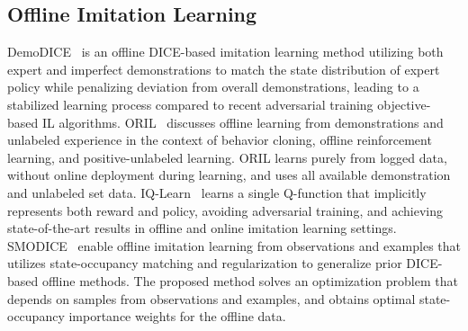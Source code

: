 \subsection{Offline Imitation Learning} 
DemoDICE~\citep{kim2022demodice} is an offline DICE-based imitation learning method utilizing both expert and imperfect demonstrations to match the state distribution of expert policy while penalizing deviation from overall demonstrations, leading to a stabilized learning process compared to recent adversarial training objective-based IL algorithms.
ORIL~\citep{zolna2020offline} discusses offline learning from demonstrations and unlabeled experience in the context of behavior cloning, offline reinforcement learning, and positive-unlabeled learning. ORIL learns purely from logged data, without online deployment during learning, and uses all available demonstration and unlabeled set data.
IQ-Learn~\citep{garg2021iq} learns a single Q-function that implicitly represents both reward and policy, avoiding adversarial training, and achieving state-of-the-art results in offline and online imitation learning settings.
SMODICE~\citep{ma2022smodice} enable offline imitation learning from observations and examples that utilizes state-occupancy matching and regularization to generalize prior DICE-based offline methods. The proposed method solves an optimization problem that depends on samples from observations and examples, and obtains optimal state-occupancy importance weights for the offline data. 


